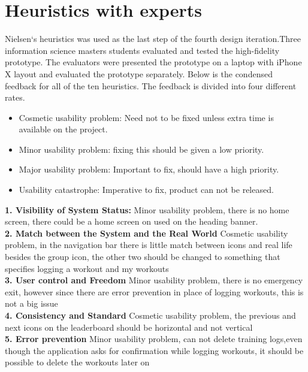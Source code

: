 \section{Heuristics with experts}\label{heur}
Nielsen`s heuristics was used as the last step of the fourth design iteration.Three information science masters students evaluated and tested the high-fidelity prototype. The evaluators were presented the prototype on a laptop with iPhone X layout and evaluated the prototype separately. Below is the condensed feedback for all of the ten heuristics. The feedback is divided into four different rates.
\begin{itemize}
    \item Cosmetic usability problem: Need not to be fixed unless extra time is available on the project.
    \item Minor usability problem: fixing this should be given a low priority.
    \item Major usability problem: Important to fix, should have a high priority.
    \item Usability catastrophe: Imperative to fix, product can not be released.
\end{itemize}


\textbf{1. Visibility of System Status:}
Minor usability problem, there is no home screen, there could be a home screen on used on the heading banner. \\

\textbf{2. Match between the System and the Real World}
Cosmetic usability problem, in the navigation bar there is little match between icons and real life besides the group icon, the other two should be changed to something that specifies logging a workout and my workouts \\

\textbf{3. User control and Freedom}
Minor usability problem, there is no emergency exit, however since there are error prevention in place of logging workouts, this is not a big issue \\

\textbf{4. Consistency and Standard}
Cosmetic usability problem, the previous and next icons on the leaderboard should be horizontal and not vertical \\

\textbf{5. Error prevention}
Minor usability problem, can not delete training logs,even though the application asks for confirmation while logging workouts, it should be possible to delete the workouts later on \\

